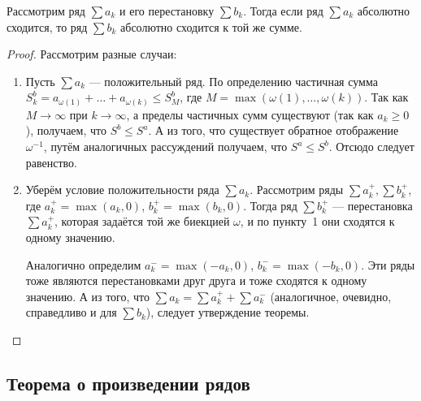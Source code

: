 \begin{theorem} \hypertarget{теорема о перестановке слагаемых}{}
	Рассмотрим ряд \(\sum a_k\) и его перестановку \(\sum b_k\). Тогда если ряд \(\sum a_k\) абсолютно сходится, то ряд \(\sum b_k\) абсолютно сходится к той же сумме.
\end{theorem}
\begin{proof}
	Рассмотрим разные случаи:
	\begin{enumerate}
		\item Пусть \(\sum a_k\) --- положительный ряд. По определению частичная сумма \(S_k^b = a_{\omega(1)} + \ldots + a_{\omega(k)} \leqslant S_M^b\), где \(M = \max (\omega(1), \ldots, \omega(k))\). Так как \(M \to \infty\) при \(k \to \infty\), а пределы частичных сумм существуют (так как \(a_k \geqslant 0\)), получаем, что \(S^b \leqslant S^a\). А из того, что существует обратное отображение \(\omega^{-1}\), путём аналогичных рассуждений получаем, что \(S^a \leqslant S^b\). Отсюдо следует равенство.
		\item Уберём условие положительности ряда \(\sum a_k\). Рассмотрим ряды \linebreak \(\sum a_k^+, \sum b_k^+\), где \(a_k^+ = \max (a_k, 0)\), \(b_k^+ = \max (b_k, 0)\). Тогда ряд \(\sum b_k^+\) --- перестановка \(\sum a_k^+\), которая задаётся той же биекцией \(\omega\), и по пункту~1 они сходятся к одному значению. 
		
		Аналогично определим \(a_k^- = \max (-a_k, 0)\), \(b_k^- = \max (-b_k, 0)\). Эти ряды тоже являются перестановками друг друга и тоже сходятся к одному значению. А из того, что \(\sum a_k = \sum a_k^+ +\sum a_k^-\) (аналогичное, очевидно, справедливо и для \(\sum b_k\)), следует утверждение теоремы.
	\end{enumerate}
\end{proof}

\subsection{Теорема о произведении рядов}

